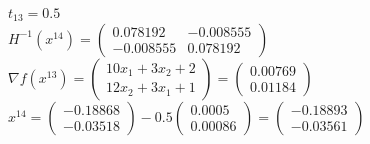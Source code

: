 $t_{13} = 0.5$\\
$ %
H^{-1}(x^{14}) = 
\begin{pmatrix}
  0.078192 & -0.008555\\
  -0.008555 & 0.078192
\end{pmatrix}
$\\

$
\nabla f(x^{13}) = 
\begin{pmatrix}
  10x_{1} + 3x_{2} + 2\\
  12x_{2} + 3x_{1} + 1
\end{pmatrix}
=
\begin{pmatrix}
  0.00769\\
  0.01184
\end{pmatrix}
$\\

$
x^{14} = 
\begin{pmatrix}
  -0.18868\\
  -0.03518
\end{pmatrix}
-
0.5
\begin{pmatrix}
  0.0005\\
  0.00086
\end{pmatrix}
=
\begin{pmatrix}
  -0.18893\\
  -0.03561
\end{pmatrix}
$\\
\pagebreak
